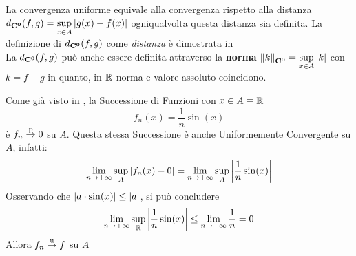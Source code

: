 \begin{observation}
	\label{obs:dist_conv_unif}
	La convergenza uniforme equivale alla convergenza rispetto alla distanza $d_{\mathbf{C^{0}}}(f,g)=\sup\limits_{x\in A}\left|g(x)-f(x)\right|$ ogniqualvolta questa distanza sia definita. La definizione di $d_{\mathbf{C^{0}}}(f,g)$ come \textit{distanza} è dimostrata in \hyperref[ex:dim_dist_conv_unif]{}\\
	La $d_{\mathbf{C^{0}}}(f,g)$ può anche essere definita attraverso la \textbf{norma} $\left\|k\right\|_{\mathbf{C^{0}}}=\sup\limits_{x\in A}\left|k\right|$ con $k = f-g$ in quanto, in $\mathbb{R}$ norma e valore assoluto coincidono.
\end{observation}
\begin{example}
	Come già visto in , la Successione di Funzioni con $x \in A \equiv \mathbb{R}$
	\[f_n(x) = \frac{1}{n} \sin(x)\]
	è $f_n \overset{\text{p}}{\to} 0$ su $A$. Questa stessa Successione è anche Uniformemente Convergente su $A$, infatti:
	\[
		\lim\limits_{n \to +\infty} \sup\limits_{A} \left|f_n(x) - 0\right| =
		\lim\limits_{n \to +\infty} \sup\limits_{A} \left|\frac{1}{n} \sin(x)\right|
	\]
	Osservando che $\left|a \cdot \sin(x)\right| \leq \left|a\right|$, si può concludere
	\[
		\lim\limits_{n \to +\infty} \sup\limits_{\mathbb{R}} \left|\frac{1}{n} \sin(x)\right| \leq
		\lim\limits_{n \to +\infty} \frac{1}{n}=0
	\]
	Allora $f_n \overset{\text{u}}{\to} f$ su $A$
\end{example}


